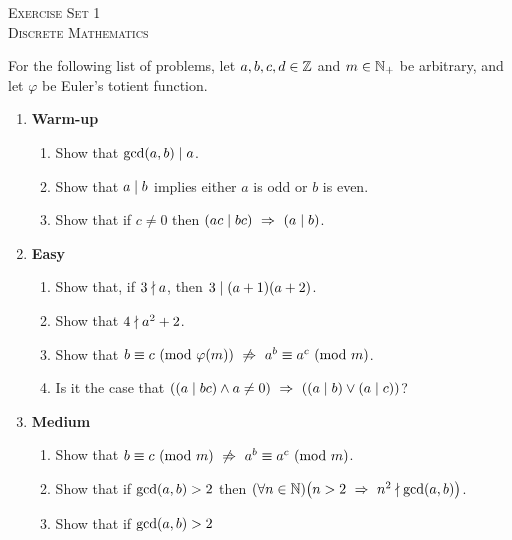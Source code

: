




\begin{center}
    \textsc{\huge Exercise Set 1}\\
    \textsc{Discrete Mathematics}
\end{center}

For the following list of problems,
let $a, b, c, d \in \mathbb{Z}$ and $m \in \mathbb{N}_+$ be arbitrary,
and let $\varphi$ be Euler's totient function.
\begin{enumerate}
    \item \textbf{Warm-up}
        \begin{enumerate}
            \item
                Show that $\gcd\pn*{a, b} \divides a$.
            \item
                Show that $a \mid b$ implies either $a$ is odd or $b$ is even.
            \item
                Show that if $c \neq 0$ then $\pn*{ac \divides bc} \implies \pn*{a \divides b}$.
        \end{enumerate}
    \item \textbf{Easy}
        \begin{enumerate}
            \item
                Show that, if $3 \nmid a$, then $3 \mid (a + 1)(a + 2)$.
            \item
                Show that $4 \nmid a^2 + 2$.
            \item
                Show that $\modulo{b}{c}{\varphi(m)} \nimplies \modulo{a^b}{a^c}{m}$.
            \item
                Is it the case that $\pn*{\pn*{a \divides bc} \meet a \neq 0} \implies \pn*{\pn*{a \divides b} \join \pn*{a \divides c}}$?
        \end{enumerate}
    \item \textbf{Medium}
        \begin{enumerate}
            \item
                Show that $\modulo{b}{c}{m} \nimplies \modulo{a^b}{a^c}{m}$.
            \item
                Show that if $\gcd\pn*{a, b} > 2$
                then $\pn*{\forall n \in \N}\pn*{n > 2 \implies n^2 \ndivides \gcd\pn*{a, b}}$.
            \item
                Show that if $\gcd\pn*{a, b} > 2$

\end{enumerate}
\end{enumerate}
